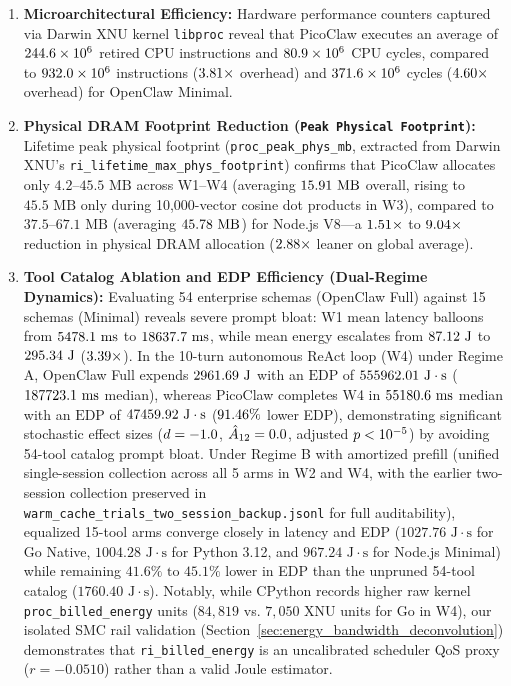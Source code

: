 \documentclass[11pt,a4paper]{article}
\begin{document}
\begin{enumerate}
    \item \textbf{Microarchitectural Efficiency:} Hardware performance counters captured via Darwin XNU kernel \texttt{libproc} reveal that PicoClaw executes an average of $244.6 \times 10^6$ retired CPU instructions and $80.9 \times 10^6$ CPU cycles, compared to $932.0 \times 10^6$ instructions ($3.81\times$ overhead) and $371.6 \times 10^6$ cycles ($4.60\times$ overhead) for OpenClaw Minimal.
    \item \textbf{Physical DRAM Footprint Reduction (\texttt{Peak Physical Footprint}):} Lifetime peak physical footprint (\texttt{proc\_peak\_phys\_mb}, extracted from Darwin XNU's \texttt{ri\_lifetime\_max\_phys\_footprint}) confirms that PicoClaw allocates only $4.2\text{--}45.5\text{ MB}$ across W1--W4 (averaging $15.91\text{ MB}$ overall, rising to $45.5\text{ MB}$ only during 10,000-vector cosine dot products in W3), compared to $37.5\text{--}67.1\text{ MB}$ (averaging $45.78\text{ MB}$) for Node.js V8---a $1.51\times$ to $9.04\times$ reduction in physical DRAM allocation ($2.88\times$ leaner on global average).
    \item \textbf{Tool Catalog Ablation and EDP Efficiency (Dual-Regime Dynamics):} Evaluating 54 enterprise schemas (OpenClaw Full) against 15 schemas (Minimal) reveals severe prompt bloat: W1 mean latency balloons from $5478.1\text{ ms}$ to $18637.7\text{ ms}$, while mean energy escalates from $87.12\text{ J}$ to $295.34\text{ J}$ ($3.39\times$). In the 10-turn autonomous ReAct loop (W4) under Regime A, OpenClaw Full expends $2961.69\text{ J}$ with an $\text{EDP}$ of $555962.01\text{ J}\cdot\text{s}$ ($187723.1\text{ ms}$ median), whereas PicoClaw completes W4 in $55180.6\text{ ms}$ median with an $\text{EDP}$ of $47459.92\text{ J}\cdot\text{s}$ ($91.46\%$ lower EDP), demonstrating significant stochastic effect sizes ($d = -1.0$, $\hat{A}_{12} = 0.0$, adjusted $p < 10^{-5}$) by avoiding 54-tool catalog prompt bloat. Under Regime B with amortized prefill (unified single-session collection across all 5 arms in W2 and W4, with the earlier two-session collection preserved in \texttt{warm\_cache\_trials\_two\_session\_backup.jsonl} for full auditability), equalized 15-tool arms converge closely in latency and EDP ($1027.76\text{ J}\cdot\text{s}$ for Go Native, $1004.28\text{ J}\cdot\text{s}$ for Python 3.12, and $967.24\text{ J}\cdot\text{s}$ for Node.js Minimal) while remaining $41.6\%\text{ to }45.1\%$ lower in EDP than the unpruned 54-tool catalog ($1760.40\text{ J}\cdot\text{s}$). Notably, while CPython records higher raw kernel \texttt{proc\_billed\_energy} units ($84{,}819$ vs. $7{,}050$ XNU units for Go in W4), our isolated SMC rail validation (Section~\ref{sec:energy_bandwidth_deconvolution}) demonstrates that \texttt{ri\_billed\_energy} is an uncalibrated scheduler QoS proxy ($r = -0.0510$) rather than a valid Joule estimator.
\end{enumerate}
\end{document}

